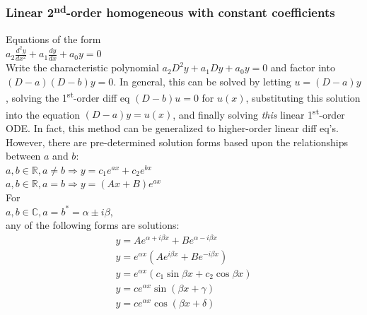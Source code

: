 \documentclass[letterpaper,landscape,10pt]{article}
\begin{document}
{\begin{multicols}{4}
		\subsubsection*{Linear 2\textsuperscript{nd}-order homogeneous with
				constant coefficients}
			Equations of the form\\
			{\centering $a_2 \frac{d^2y}{dx^2} + a_1 \frac{dy}{dx} + a_0y = 0$\\}
			Write the characteristic polynomial $a_2D^2y + a_1 Dy + a_0y = 0$
			and factor into $(D-a)(D-b)y = 0$.  In general, this can be solved
			by letting $u=(D-a)y$, solving the 1\textsuperscript{st}-order diff
			eq $(D-b)u=0$ for $u(x)$, substituting this solution into the
			equation $(D-a)y=u(x)$, and finally solving \emph{this} linear
			1\textsuperscript{st}-order ODE.  In fact, this method can be
			generalized to higher-order linear diff eq's.  However, there are
			pre-determined solution forms based upon the relationships between
			$a$ and $b$:\\
			{\centering $ a, b \in \mathbb{R}, a \neq b \Rightarrow
			y=c_1e^{ax}+c_2e^{bx} $\\}
			{\centering $ a, b \in \mathbb{R}, a = b \Rightarrow y=(Ax+B)e^{ax} $\\}
			For\\
			{\centering $ a, b \in \mathbb{C}, a = b^\ast = \alpha \pm i\beta, $\\}
			any of the following forms are solutions:\\
			\begin{gather*}
				y=Ae^{\alpha + i\beta x} + Be^{\alpha - i\beta x}\\
				y=e^{\alpha x}\left(Ae^{i\beta x} + Be^{-i\beta x}\right)\\
				y=e^{\alpha x}\left(c_1\sin\beta x + c_2\cos\beta x\right)\\
				y=ce^{\alpha x}\sin\left( \beta x + \gamma \right)\\
				y=ce^{\alpha x}\cos\left( \beta x + \delta \right)
			\end{gather*}


\end{multicols}}
\end{document}
